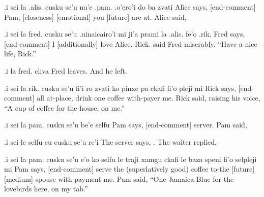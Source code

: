 \begin{example}
.i sei la .alis. cusku se'u\n
\T	nu'e .pam. .o'ero'i\n
\T	do ba zvati\n
{} Alice says, [end-comment]\n
\T	[Promise-to] Pam, [closeness] [emotional]\n
\T	you [future] are-at.\n
Alice said, 
\end{example}

\begin{example}
.i sei la fred. cusku se'u\n
\T	.uinaicairo'i\n
\T	mi ji'a prami la .alis.\n
\T	fe'o .rik.\n
{} Fred says, [end-comment]\n
\T	[Happy] [not] [emphatic] [emotional]\n
\T	I [additionally] love Alice.\n
{} Rick.\n
{} said Fred miserably.  ``Have a\n
\T	nice life, Rick.''
\end{example}

\begin{example}
.i la fred. cliva\n
Fred leaves.\n
And he left.
\end{example}

\begin{example}
.i sei la rik. cusku se'u\n
\T	fi'i ro zvati\n
\T	ko pinxe pa ckafi\n
\T	fi'o pleji mi\n
{} Rick says, [end-comment]\n
\T	[Welcome-to] all at-place,\n
{} drink one coffee\n
\T	with-payer me.\n
Rick said, raising his voice, ``A cup of coffee\n
\T	for the house, on me.''
\end{example}

\begin{example}
.i sei la pam. cusku se'u\n
\T	be'e selfu\n
{} Pam says, [end-comment]\n
{} server.\n
Pam said, 
\end{example}

\begin{example}
.i sei le selfu cu cusku se'u\n
\T	re'i \n
[Comment] The server says,\n
{}.\n
The waiter replied, 
\end{example}

\begin{example}
.i sei la pam. cusku se'u\n
\T	e'o ko selfu\n
\T	le traji xamgu ckafi\n
\T	le baza speni\n
\T	fi'o selpleji mi\n
{} Pam says, [end-comment]\n
{} serve\n
\T	the (superlatively good) coffee\n
\T	to-the [future] [medium] spouse\n
\T	with-payment me.\n
Pam said, ``One Jamaica Blue for the lovebirds here,\n
\T	on my tab.''
\end{example}

